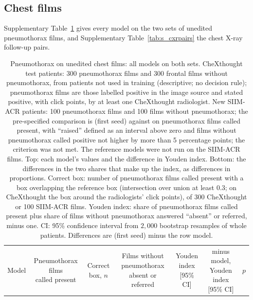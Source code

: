 \clearpage
\subsection{Chest films}
\label{subsec:s_chest}

Supplementary Table~\ref{tab:s_chest} gives every model on the two sets of unedited pneumothorax films, and Supplementary Table~\ref{tab:s_cxrpairs} the chest X-ray follow-up pairs.

\begin{table}[!htbp]
\caption{Pneumothorax on unedited chest films: all models on both sets. CheXthought test patients: 300 pneumothorax films and 300 frontal films without pneumothorax, from patients not used in training (descriptive; no decision rule); pneumothorax films are those labelled positive in the image source and stated positive, with click points, by at least one CheXthought radiologist. New SIIM-ACR patients: 100 pneumothorax films and 100 films without pneumothorax; the pre-specified comparison is \msn{} (first seed) against \msp{} on pneumothorax films called present, with ``raised'' defined as an interval above zero and films without pneumothorax called positive not higher by more than 5 percentage points; the criterion was not met. The reference models were not run on the SIIM-ACR films. Top: each model's values and the difference in Youden index. Bottom: the differences in the two shares that make up the index, as differences in proportions. Correct box: number of pneumothorax films called present with a box overlapping the reference box (intersection over union at least 0.3; on CheXthought the box around the radiologists' click points), of 300 CheXthought or 100 SIIM-ACR films. Youden index: share of pneumothorax films called present plus share of films without pneumothorax answered ``absent'' or referred, minus one. CI: 95\% confidence interval from $2{,}000$ bootstrap resamples of whole patients. Differences are \msn{} (first seed) minus the row model.}
\label{tab:s_chest}
\centering
\footnotesize
\begin{adjustbox}{max width=\linewidth}
\begin{tabular}{l ccc c cc}
\toprule
Model & \shortstack{Pneumothorax films\\called present} & \shortstack{Correct\\box, $n$} & \shortstack{Films without pneumothorax\\absent or referred} & \shortstack{Youden index\\{}[95\% CI]} & \shortstack{\msn{} minus model,\\Youden index [95\% CI]} & $p$ \\

\end{tabular}
\end{adjustbox}
\end{table}
